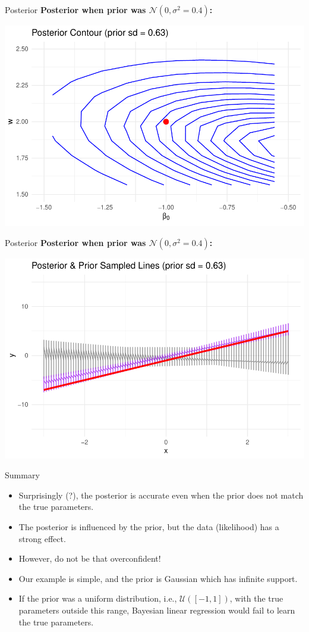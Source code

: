 \documentclass{beamer}
\begin{document}
\begin{frame}{Posterior}
  \textbf{Posterior when prior was \(\mathcal{N}(0, \sigma^2=0.4)\):}

  \begin{center}
    \includegraphics[width=0.8\linewidth]{posterior_contour_3.pdf}
  \end{center}
\end{frame}

\begin{frame}{Posterior}
  \textbf{Posterior when prior was \(\mathcal{N}(0, \sigma^2=0.4)\):}

  \begin{center}
    \includegraphics[width=0.8\linewidth]{posterior_lines_3.pdf}
  \end{center}
\end{frame}

\begin{frame}{Summary}
  \begin{itemize}
  \item Surprisingly (?), the posterior is accurate even when the prior does not match the true parameters.
  \item The posterior is influenced by the prior, but the data (likelihood) has a strong effect.
  \item However, do not be that overconfident!
  \item Our example is simple, and the prior is Gaussian which has infinite support.
  \item If the prior was a uniform distribution, i.e., $\mathcal{U}([-1, 1])$, with the true parameters outside this range, Bayesian linear regression would fail to learn the true parameters.
  \end{itemize}
\end{frame}
\end{document}
